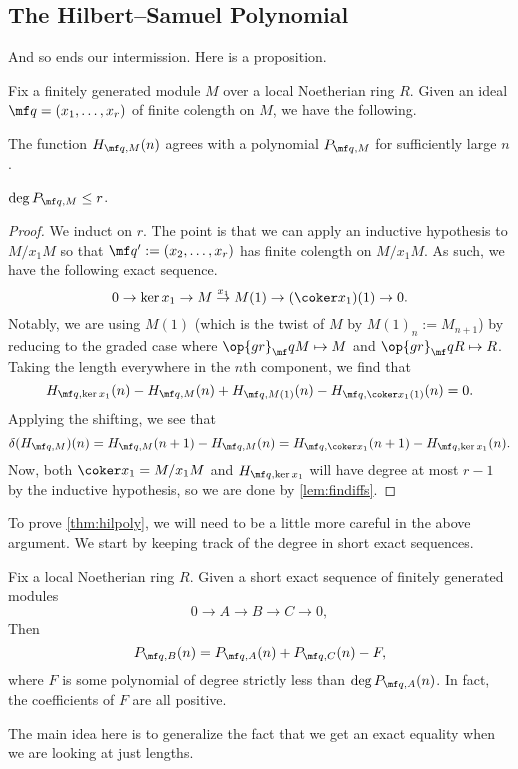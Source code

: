 \subsection{The Hilbert--Samuel Polynomial}
And so ends our intermission. Here is a proposition.
\begin{proposition} \label{prop:onesideofhilsampoly}
	Fix a finitely generated module $M$ over a local Noetherian ring $R$. Given an ideal $\mf q=(x_1,\ldots,x_r)$ of finite colength on $M$, we have the following.
	\begin{listalph}
		\item The function $H_{\mf q,M}(n)$ agrees with a polynomial $P_{\mf q,M}$ for sufficiently large $n$.
		\item $\deg P_{\mf q,M}\le r$.
	\end{listalph}
\end{proposition}
\begin{proof}
	We induct on $r$. The point is that we can apply an inductive hypothesis to $M/x_1M$ so that $\mf q':=(x_2,\ldots,x_r)$ has finite colength on $M/x_1M$. As such, we have the following exact sequence.
	\[0\to\ker x_1\to M\stackrel{x_1}\to M(1)\to(\coker x_1)(1)\to0.\]
	Notably, we are using $M(1)$ (which is the twist of $M$ by $M(1)_n:=M_{n+1}$) by reducing to the graded case where $\op{gr}_\mf qM\mapsto M$ and $\op{gr}_\mf qR\mapsto R$. Taking the length everywhere in the $n$th component, we find that
	\[H_{\mf q,\ker x_1}(n)-H_{\mf q,M}(n)+H_{\mf q,M(1)}(n)-H_{\mf q,\coker x_1(1)}(n)=0.\]
	Applying the shifting, we see that
	\[\delta(H_{\mf q,M})(n)=H_{\mf q,M}(n+1)-H_{\mf q,M}(n)=H_{\mf q,\coker x_1}(n+1)-H_{\mf q,\ker x_1}(n).\]
	Now, both $\coker x_1=M/x_1M$ and $H_{\mf q,\ker x_1}$ will have degree at most $r-1$ by the inductive hypothesis, so we are done by \autoref{lem:findiffs}.
\end{proof}
To prove \autoref{thm:hilpoly}, we will need to be a little more careful in the above argument. We start by keeping track of the degree in short exact sequences.
\begin{lemma} \label{lem:hilpolyadditive}
	Fix a local Noetherian ring $R$. Given a short exact sequence of finitely generated modules
	\[0\to A\to B\to C\to 0,\]
	Then
	\[P_{\mf q,B}(n)=P_{\mf q,A}(n)+P_{\mf q,C}(n)-F,\]
	where $F$ is some polynomial of degree strictly less than $\deg P_{\mf q,A}(n)$. In fact, the coefficients of $F$ are all positive.
\end{lemma}
\begin{remark}
	The main idea here is to generalize the fact that we get an exact equality when we are looking at just lengths.
\end{remark}
